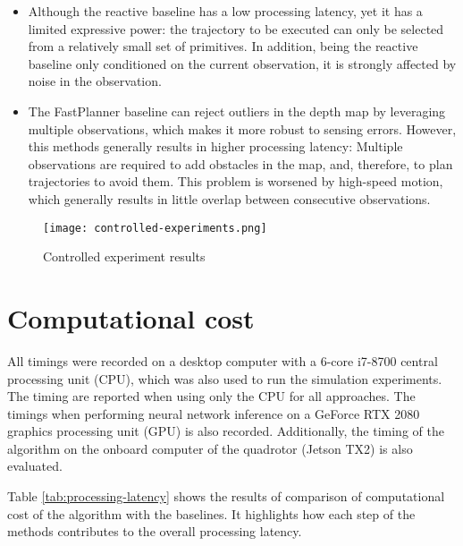 \begin{itemize}
	\item Although the reactive \cite{reactive_method} baseline has a low processing latency, yet it has a limited expressive power: the trajectory to be executed can only be selected from a relatively small set of primitives. In addition, being the reactive \cite{reactive_method} baseline only conditioned on the current observation, it is strongly affected by noise in the observation.
	\item The FastPlanner \cite{fastPlanner} baseline can reject outliers in the depth map by leveraging multiple observations, which makes it more robust to sensing errors. However, this methods generally results in higher processing latency: Multiple observations are required to add obstacles in the map, and, therefore, to plan trajectories to avoid them. This problem is worsened by high-speed motion, which generally results in little overlap between consecutive observations.
\end{itemize}

\begin{figure}[!h]
	\texttt{[image: controlled-experiments.png]}
	\caption{Controlled experiment results}
	\label{fig:stimulated_results}
\end{figure}


\section{Computational cost}
All timings were recorded on a desktop computer with a 6-core i7-8700 central processing unit (CPU), which was also used to run the simulation experiments. The timing are reported when using only the CPU for all approaches. The timings when performing neural network inference on a GeForce RTX 2080 graphics processing unit (GPU) is also recorded. Additionally, the timing of the algorithm on the onboard computer of the quadrotor (Jetson TX2) is also evaluated.

Table \ref{tab:processing-latency} shows the results of comparison of computational cost of the algorithm with the baselines. It highlights how each step of the methods contributes to the overall processing latency. 

